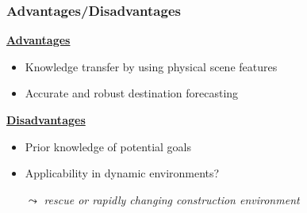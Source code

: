\begin{frame}
	\frametitle{Advantages/Disadvantages}
	
	\Large
	
	\vspace{0.4cm}
	
	\underline{\textbf{Advantages}} \\
	
	\vspace{0.2cm}
	
	\begin{itemize}
		\item Knowledge transfer by using physical scene features
		\item Accurate and robust destination forecasting
	\end{itemize}
	
	\vspace{0.2cm}
	
	\underline{\textbf{Disadvantages}} \\
	
	\vspace{0.19cm}
	
	\begin{itemize}
		\item Prior knowledge of potential goals
		\item Applicability in dynamic environments? \\
			  \vspace{-0.2cm}
			  \begin{tabbing}
				  \hspace{0.3cm}
				  \large
				  $ \leadsto $ \emph{rescue or rapidly changing construction environment}
			  \end{tabbing}
	\end{itemize}
\end{frame}
